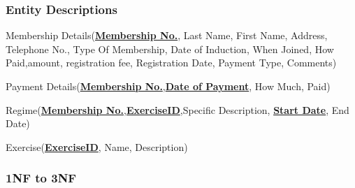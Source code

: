 \begin{itemize}
\subsubsection{Entity Descriptions}

Membership Details(\textbf{\underline{Membership No.}}, Last Name, First Name, Address, Telephone No., Type Of Membership, Date of Induction, When Joined, How Paid,amount, registration fee, Registration Date, Payment Type, Comments)

Payment Details(\textbf{\underline{Membership No.}},\textbf{\underline{Date of Payment}}, How Much, Paid)

Regime(\textbf{\underline{Membership No.}},\textbf{\underline{ExerciseID}},Specific Description, \textbf{\underline{Start Date}}, End Date)

Exercise(\textbf{\underline{ExerciseID}}, Name, Description)


\subsubsection{1NF to 3NF}


\end{itemize}
